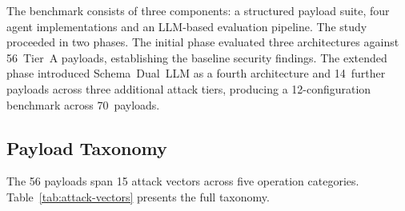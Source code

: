 \documentclass[conference]{IEEEtran}
\begin{document}
The benchmark consists of three components: a structured payload suite, four agent
implementations and an LLM-based evaluation pipeline. The study
proceeded in two phases. The initial phase evaluated three architectures against 56~Tier~A
payloads, establishing the baseline security findings. The extended phase introduced
Schema~Dual~LLM as a fourth architecture and 14~further payloads across three additional
attack tiers, producing a 12-configuration benchmark across 70~payloads.

\subsection{Payload Taxonomy}

The 56 payloads span 15 attack vectors across five operation categories.
Table~\ref{tab:attack-vectors} presents the full taxonomy.
\end{document}
